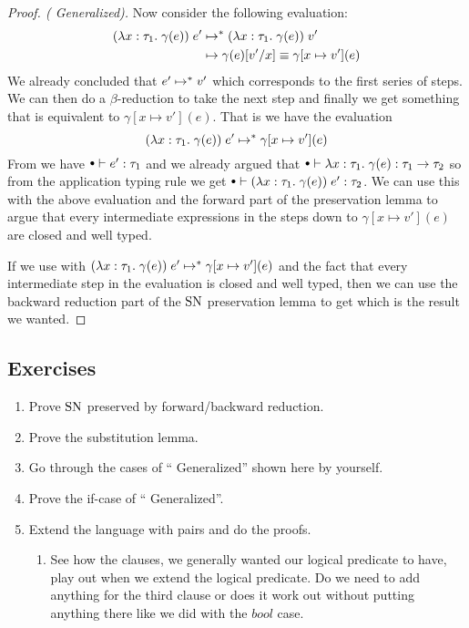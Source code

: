\begin{proof}[Proof. ( Generalized)]
Now consider the following evaluation:
\begin{align*}
  (\lambda x : \tau_1 . \; \gamma(e)) \; e' & \mapsto^{*} (\lambda x : \tau_1 . \; \gamma(e)) \; v' \\
                                       & \mapsto \gamma(e)[v'/x] \equiv 
                                                   \gamma[x \mapsto v'](e)
\end{align*}
We already concluded that $e' \mapsto^{*} v'$ which corresponds to the first series of steps. We can then do a $\beta$-reduction to take the next step and finally we get something that is equivalent to $\gamma[x \mapsto v'](e)$. That is we have the evaluation
\[
(\lambda x : \tau_1 . \; \gamma(e)) \; e' \mapsto^{*} \gamma[x \mapsto v'](e)
\]
From  we have $\mtenv \vdash e' : \tau_1$ and we already argued that $\mtenv \vdash \tlabs{x}{\tau_1}{\gamma(e)} : \tarrow{\tau_1}{\tau_2}$ so from the application typing rule we get $\mtenv \vdash (\tlabs{x}{\tau_1}{\gamma(e)}) \; e' : \tau_2$. We can use this with the above evaluation and the forward part of the preservation lemma to argue that every intermediate expressions in the steps down to $\gamma[x \mapsto v'](e)$ are closed and well typed.

If we use  with $(\lambda x : \tau_1 . \; \gamma(e)) \; e' \mapsto^{*} \gamma[x \mapsto v'](e)$ and the fact that every intermediate step in the evaluation is closed and well typed, then we can use the backward reduction part of the $\operatorname{SN}$ preservation lemma to get  which is the result we wanted.
\end{proof}
\subsection*{Exercises}
\begin{enumerate}
\item Prove $\operatorname{SN}$ preserved by forward/backward reduction.
\item Prove the substitution lemma.
\item Go through the cases of `` Generalized'' shown here by yourself.
\item Prove the if-case of `` Generalized''.
\item Extend the language with pairs and do the proofs. 
  \begin{enumerate}
  \item See how the clauses, we generally wanted our logical predicate to have, play out when we extend the logical predicate. Do we need to add anything for the third clause or does it work out without putting anything there like we did with the $bool$ case.
  \end{enumerate}
\end{enumerate}
\clearpage

